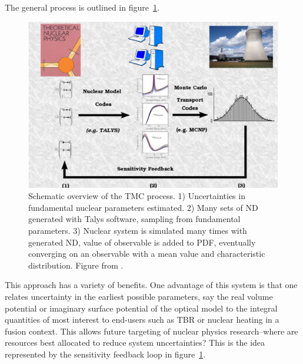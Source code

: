 
The general process is outlined in figure~\ref{fig:tmc_overview}.


\begin{figure}
  \centering
  \includegraphics[width=\textwidth]{tmc_overview.png}
  \caption{Schematic overview of the TMC process. 1) Uncertainties in fundamental nuclear parameters estimated. 2) Many sets of ND generated with Talys software, sampling from fundamental parameters. 3) Nuclear system is simulated many times with generated ND, value of observable is added to PDF, eventually converging on an observable with a mean value and characteristic distribution. Figure from \cite{Koning2008}.}
  \label{fig:tmc_overview}
\end{figure}

This approach has a variety of benefits. One advantage of this system is that one relates uncertainty in the earliest possible parameters, say the real volume potential or imaginary surface potential of the optical model to the integral quantities of most interest to end-users such as TBR or nuclear heating in a fusion context. This allows future targeting of nuclear physics research--where are resources best allocated to reduce system uncertainties? This is the idea represented by the sensitivity feedback loop in figure~\ref{fig:tmc_overview}.



